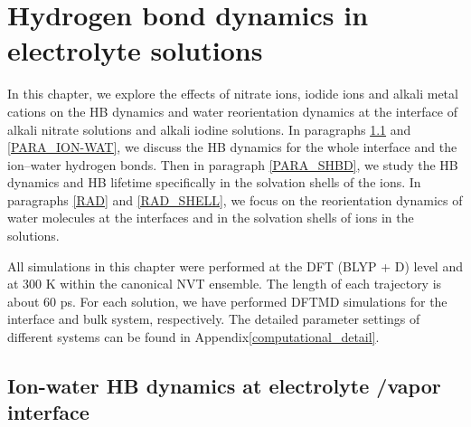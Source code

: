 \chapter{Hydrogen bond dynamics in electrolyte solutions}\label{CHAPTER_HB_SOLUTIONS}
In this chapter, we explore the effects of nitrate ions, iodide ions and alkali metal cations 
on the HB dynamics and water reorientation dynamics at the interface of alkali nitrate solutions and alkali
iodine solutions. %
In paragraphs \ref{HBD_ITP} and \ref{PARA_ION-WAT}, we discuss the HB dynamics for the whole interface and the ion--water hydrogen bonds. 
Then in paragraph \ref{PARA_SHBD}, we study the HB dynamics and HB lifetime specifically in the solvation shells of the ions.
In paragraphs \ref{RAD} and \ref{RAD_SHELL}, we focus on the reorientation dynamics of water molecules at the interfaces
and in the solvation shells of ions in the solutions.

All simulations in this chapter were performed at the DFT (BLYP + D) level and at 300 K within the canonical NVT ensemble.
The length of each trajectory is about 60 ps.
For each solution, we have performed DFTMD simulations for the interface and bulk system, respectively. 
The detailed parameter settings of different systems can be found in Appendix\thinspace\ref{computational_detail}.

\section{Ion-water HB dynamics at electrolyte /vapor interface}\label{HBD_ITP}
